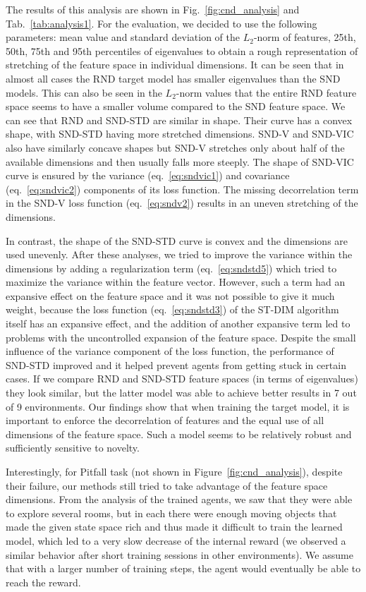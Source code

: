 \documentclass[a4paper,11pt]{elsarticle}
\begin{document}
The results of this analysis are shown in Fig.~\ref{fig:cnd_analysis} and Tab.~\ref{tab:analysis1}. For the evaluation, we decided to use the following parameters: mean value and standard deviation of the $L_{2}$-norm of features, 25th, 50th, 75th and 95th percentiles of eigenvalues to obtain a rough representation of stretching of the feature space in individual dimensions.
It can be seen that in almost all cases the RND target model has smaller eigenvalues than the SND models. This can also be seen in the $L_2$-norm values that the entire RND feature space seems to have a smaller volume compared to the SND feature space. 
We can see that RND and SND-STD are similar in shape. Their curve has a convex shape, with SND-STD having more stretched dimensions. SND-V and SND-VIC also have similarly concave shapes but SND-V stretches only about half of the available dimensions and then usually falls more steeply. The shape of SND-VIC curve is ensured by the variance (eq.~\ref{eq:sndvic1}) and covariance (eq.~\ref{eq:sndvic2}) components of its loss function. The missing decorrelation term in the SND-V loss function (eq.~\ref{eq:sndv2}) results in an uneven stretching of the dimensions.

In contrast, the shape of the SND-STD curve is convex and the dimensions are used unevenly. After these analyses, we tried to improve the variance within the dimensions by adding a regularization term (eq.~\ref{eq:sndstd5}) which tried to maximize the variance within the feature vector. However, such a term had an expansive effect on the feature space and it was not possible to give it much weight, because the loss function (eq.~\ref{eq:sndstd3}) of the ST-DIM algorithm itself has an expansive effect, and the addition of another expansive term led to problems with the uncontrolled expansion of the feature space. 
Despite the small influence of the variance component of the loss function, the performance of SND-STD improved and it helped prevent agents from getting stuck in certain cases. If we compare RND and SND-STD feature spaces (in terms of eigenvalues) they look similar, but the latter model was able to achieve better results in 7 out of 9 environments. Our findings show that when training the target model, it is important to enforce the decorrelation of features and the equal use of all dimensions of the feature space. Such a model seems to be relatively robust and sufficiently sensitive to novelty.

Interestingly, for Pitfall task (not shown in Figure~\ref{fig:cnd_analysis}), despite their failure, our methods still tried to take advantage of the feature space dimensions. 
From the analysis of the trained agents, we saw that they were able to explore several rooms, but in each there were enough moving objects that made the given state space rich and thus made it difficult to train the learned model, which led to a very slow decrease of the internal reward (we observed a similar behavior after short training sessions in other environments). We assume that with a larger number of training steps, the agent would eventually be able to reach the reward.
\end{document}
